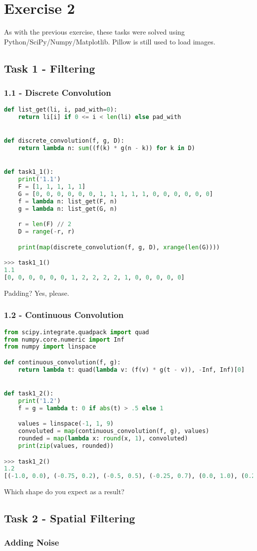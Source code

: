 \chapter{Exercise 2}

As with the previous exercise, these tasks were solved using Python/SciPy/Numpy/Matplotlib.
Pillow is still used to load images.

\section*{Task 1 - Filtering}

\subsection*{1.1 - Discrete Convolution}

\begin{lstlisting}[language=Python, label=discrete_convolution, caption=Discrete convolution - box filter]
def list_get(li, i, pad_with=0):
    return li[i] if 0 <= i < len(li) else pad_with


def discrete_convolution(f, g, D):
    return lambda n: sum((f(k) * g(n - k)) for k in D)


def task1_1():
    print('1.1')
    F = [1, 1, 1, 1, 1]
    G = [0, 0, 0, 0, 0, 0, 1, 1, 1, 1, 1, 0, 0, 0, 0, 0, 0]
    f = lambda n: list_get(F, n)
    g = lambda n: list_get(G, n)

    r = len(F) // 2
    D = range(-r, r)

    print(map(discrete_convolution(f, g, D), xrange(len(G))))

>>> task1_1()
1.1
[0, 0, 0, 0, 0, 0, 1, 2, 2, 2, 2, 1, 0, 0, 0, 0, 0]
\end{lstlisting}

Padding? Yes, please.

\subsection*{1.2 - Continuous Convolution}

\begin{lstlisting}[language=Python, label=continous_convolution, caption=Continous convolution]
from scipy.integrate.quadpack import quad
from numpy.core.numeric import Inf
from numpy import linspace

def continuous_convolution(f, g):
    return lambda t: quad(lambda v: (f(v) * g(t - v)), -Inf, Inf)[0]


def task1_2():
    print('1.2')
    f = g = lambda t: 0 if abs(t) > .5 else 1

    values = linspace(-1, 1, 9)
    convoluted = map(continuous_convolution(f, g), values)
    rounded = map(lambda x: round(x, 1), convoluted)
    print(zip(values, rounded))

>>> task1_2()
1.2
[(-1.0, 0.0), (-0.75, 0.2), (-0.5, 0.5), (-0.25, 0.7), (0.0, 1.0), (0.25, 0.7), (0.5, 0.5), (0.75, 0.2), (1.0, 0.0)]
\end{lstlisting}

Which shape do you expect as a result?

\section*{Task 2 - Spatial Filtering}

\subsection*{Adding Noise}
